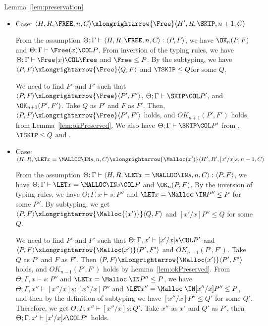 \begin{pfof}{Lemma~\ref{lem:preservation}}
\begin{itemize}
\item Case: \(\langle H, R, \FREE, n, C\rangle \xlongrightarrow{\Free}
  \langle H', R, \SKIP, n + 1, C \rangle \)

  From the assumption \( \Theta; \Gamma \vdash \langle H, R, \FREE, n,
  C \rangle : \langle P, F \rangle\), we have \(\OK_n(P, F)\) and
  \(\Theta; \Gamma \vdash \Free(x) \COL P\).  From inversion of the
  typing rules, we have \(\Theta; \Gamma \vdash \Free(x) \COL \Free\)
  and \(\Free \le P\). By the subtyping, we have \( \langle P, F
  \rangle \xLongrightarrow{\Free} \langle Q, F \rangle\) and \(\TSKIP
  \le Q \)for some \(Q\).

  We need to find \(P'\) and \(F'\) such that \( \langle P, F \rangle
  \xLongrightarrow{\Free} \langle P', F' \rangle \), \(\Theta; \Gamma
  \vdash \SKIP \COL P'\), and \(\OK_{n+1}(P', F')\).  Take \(Q\) as
  \(P'\) and \(F\) as \(F'\).  Then, \( \langle P, F \rangle
  \xLongrightarrow{\Free} \langle P', F' \rangle \) holds, and
  \(OK_{n+1}(P', F')\) holds from Lemma~\ref{lem:okPreserved}.  We
  also have \(\Theta; \Gamma \vdash \SKIP \COL P'\) from ,
  \(\TSKIP \le Q\) and .

\item Case: \( \langle H, R, \LET x = \MALLOC \IN s, n, C\rangle
  \xlongrightarrow{\Malloc(x')} \langle H', R', [x'/x]s, n - 1, C \rangle \)

  From the assumption \( \Theta; \Gamma \vdash \langle H, R, \LET x =
  \MALLOC \IN s, n, C \rangle : \langle P, F \rangle\), we have
  \(\Theta; \Gamma \vdash \LET x = \MALLOC \IN s \COL P\) and
  \(\OK_{n}(P, F)\). By the inversion of typing rules, we have
  \(\Theta; \Gamma, x \vdash s : P'' \) and \( \LET x = \Malloc \; \IN
  P'' \le P \) for some \(P''\). By subtyping, we get \( \langle P, F
  \rangle \xLongrightarrow{\Malloc{(x')}} \langle Q, F \rangle \) and \( [x'/x]P''
  \le Q\) for some \(Q\).

  We need to find \(P'\) and \(F'\) such that \(\Theta;\Gamma, x'
  \vdash [x'/x]s\COL P'\) and \( \langle P, F \rangle
  \xLongrightarrow{\Malloc(x')} \langle P', F' \rangle\) and
  \(OK_{n-1}(P', F')\). Take \(Q\) as \(P'\) and \(F\) as \(F'\).
  Then \( \langle P, F \rangle \xLongrightarrow{\Malloc(x')} \langle
  P', F' \rangle\) holds, and \(OK_{n-1}(P', F')\) holds by
  Lemma~\ref{lem:okPreserved}. From \(\Theta; \Gamma, x \vdash s :
  P''\) and \(\LET x = \Malloc \; \IN P'' \le P\), we have \(\Theta;
  \Gamma, x'' \vdash [x''/x]s : [x''/x]P''\) and \(\LET x'' = \Malloc
  \; \IN [x''/x]P'' \le P\), and then by the definition of subtyping
  we have \([x''/x]P'' \le Q'\) for some \(Q'\). Therefore, we get
  \(\Theta; \Gamma, x'' \vdash [x''/x]s : Q'\). Take \(x''\) as \(x'\)
  and \(Q'\) as \(P'\), then \(\Theta;\Gamma, x' \vdash
  [x'/x]s\COL P'\) holds.
      

\end{itemize}
\end{pfof}

